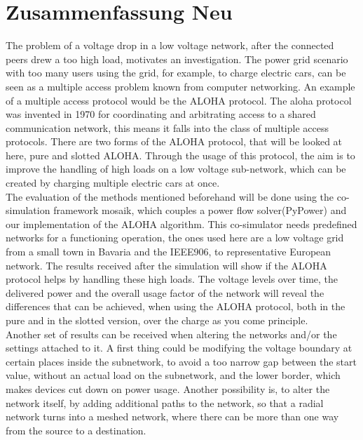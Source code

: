 
\chapter{Zusammenfassung Neu} 
The problem of a voltage drop in a low voltage network, after the connected peers drew a too high load, motivates an investigation. The power grid scenario with too many users using the grid, for example, to charge electric cars, can be seen as a multiple access problem known from computer networking. An example of a multiple access protocol
 would be the ALOHA protocol. The aloha protocol was invented in 1970 for coordinating and arbitrating access to a shared communication network, this means it falls into the class of multiple access protocols. There are two forms of the ALOHA protocol, that will be looked at here, pure and slotted ALOHA. Through the usage of this protocol, the aim is to improve the handling of high loads on a low voltage sub-network, which can be created by charging multiple electric cars at once. \\
The evaluation of the methods mentioned beforehand will be done using the co-simulation framework mosaik, which couples a power flow solver(PyPower) and our implementation of the ALOHA algorithm. This co-simulator needs predefined networks for a functioning operation, the ones used here are a low voltage grid from a small town in Bavaria and the IEEE906, to representative European network. The results received after the simulation will show if the ALOHA protocol helps by handling these high loads. The voltage levels over time, the delivered power and the overall usage factor of the network will reveal the differences that can be achieved, when using the ALOHA protocol, both in the pure and in the slotted version, over the charge as you come principle.\\
Another set of results can be received when altering the networks and/or the settings attached to it. A first thing could be modifying the voltage boundary at certain places inside the subnetwork, to avoid a too narrow gap between the start value, without an actual load on the subnetwork, and the lower border, which makes devices cut down on power usage. Another possibility is, to alter the network itself, by adding additional paths to the network, so that a radial network turns into a meshed network, where there can be more than one way from the source to a destination.
